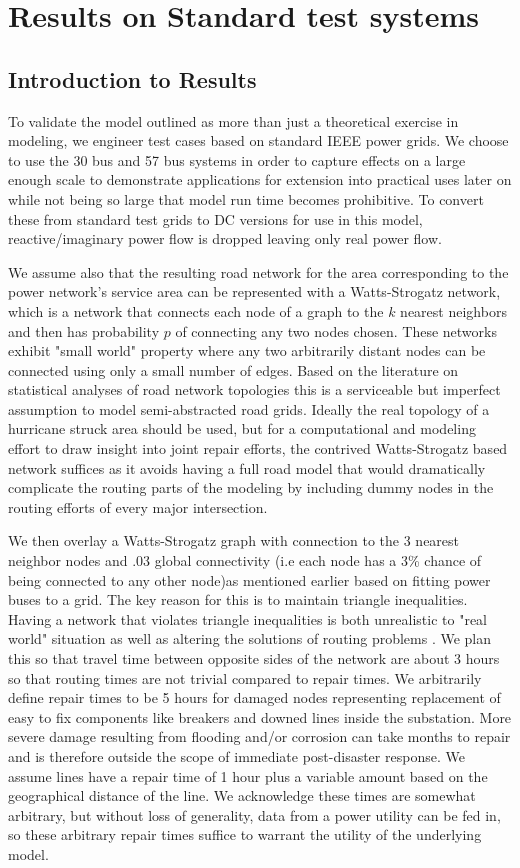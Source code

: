 \documentclass{article}
\begin{document}
	\section{Results on Standard test systems}
	\subsection{Introduction to Results}
	To validate the model outlined as more than just a theoretical exercise in modeling, we engineer test cases based on standard IEEE power grids. We choose to use the 30 bus and 57 bus systems in order to capture effects on a large enough scale to demonstrate applications for extension into practical uses later on while not being so large that model run time becomes prohibitive. To convert these from standard test grids to DC versions for use in this model, reactive/imaginary power flow is dropped leaving only real power flow.
	
		We assume also that the resulting road network for the area corresponding to the power network's service area can be represented with a Watts-Strogatz network, which is a network that connects each node of a graph to the $k$ nearest neighbors and then has probability $p$ of connecting any two nodes chosen. These networks exhibit "small world" property where any two arbitrarily distant nodes can be connected using only a small number of edges. Based on the literature on statistical analyses of road network topologies \cite{LammerEA2006} \cite{ChanEA2011} this is a serviceable but imperfect assumption to model semi-abstracted road grids. Ideally the real topology of a hurricane struck area should be used, but for a computational and modeling effort to draw insight into joint repair efforts, the contrived Watts-Strogatz based network suffices as it avoids having a full road model that would dramatically complicate the routing parts of the modeling by including dummy nodes in the routing efforts of every major intersection.
		
		 We then overlay a Watts-Strogatz graph with connection to the 3 nearest neighbor nodes and .03 global connectivity (i.e each node has a 3\% chance of being connected to any other node)as mentioned earlier based on fitting power buses to a grid. The key reason for this is to maintain triangle inequalities. Having a network that violates triangle inequalities is both unrealistic to "real world" situation as well as altering the solutions of routing problems \cite{FlemingEA2013}. We plan this so that travel time between opposite sides of the network are about 3 hours so that routing times are not trivial compared to repair times. We arbitrarily define repair times to be 5 hours for damaged nodes representing replacement of easy to fix components like breakers and downed lines inside the substation. More severe damage resulting from flooding and/or corrosion can take months to repair and is therefore outside the scope of immediate post-disaster response. We assume lines have a repair time of 1 hour plus a variable amount based on the geographical distance of the line. We acknowledge these times are somewhat arbitrary, but without loss of generality, data from a power utility can be fed in, so these arbitrary repair times suffice to warrant the utility of the underlying model.
	
\end{document}
